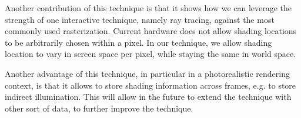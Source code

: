 Another contribution of this technique is that it shows how we can leverage the strength of one interactive technique, namely ray tracing, against the most commonly used rasterization. Current hardware does not allow shading locations to be arbitrarily chosen within a pixel. In our technique, we allow shading location to vary in screen space per pixel, while staying the same in world space.

Another advantage of this technique, in particular in a photorealistic rendering context, is that it allows to store shading information across frames, e.g. to store indirect illumination. This will allow in the future to extend the technique with other sort of data, to further improve the technique. 
%

